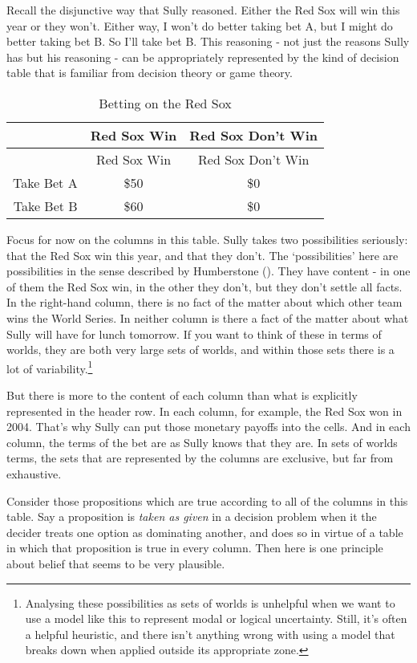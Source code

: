 \documentclass[
  10pt,
  letterpaper,
  twoside]{scrbook}
\begin{document}
Recall the disjunctive way that Sully reasoned. Either the Red Sox will
win this year or they won't. Either way, I won't do better taking bet A,
but I might do better taking bet B. So I'll take bet B. This reasoning -
not just the reasons Sully has but his reasoning - can be appropriately
represented by the kind of decision table that is familiar from decision
theory or game theory.

\begin{longtable}[]{@{}rcc@{}}
\caption{Betting on the Red Sox}\label{tbl-redsox}\tabularnewline
\toprule\noalign{}
~ & Red Sox Win & Red Sox Don't Win \\
\midrule\noalign{}
\endfirsthead
\toprule\noalign{}
~ & Red Sox Win & Red Sox Don't Win \\
\midrule\noalign{}
\endhead
\bottomrule\noalign{}
\endlastfoot
Take Bet A & \$50 & \$0 \\
Take Bet B & \$60 & \$0 \\
\end{longtable}

Focus for now on the columns in this table. Sully takes two
possibilities seriously: that the Red Sox win this year, and that they
don't. The `possibilities' here are possibilities in the sense described
by Humberstone (). They have content
- in one of them the Red Sox win, in the other they don't, but they
don't settle all facts. In the right-hand column, there is no fact of
the matter about which other team wins the World Series. In neither
column is there a fact of the matter about what Sully will have for
lunch tomorrow. If you want to think of these in terms of worlds, they
are both very large sets of worlds, and within those sets there is a lot
of variability.\footnote{Analysing these possibilities as sets of worlds
  is unhelpful when we want to use a model like this to represent modal
  or logical uncertainty. Still, it's often a helpful heuristic, and
  there isn't anything wrong with using a model that breaks down when
  applied outside its appropriate zone.}

But there is more to the content of each column than what is explicitly
represented in the header row. In each column, for example, the Red Sox
won in 2004. That's why Sully can put those monetary payoffs into the
cells. And in each column, the terms of the bet are as Sully knows that
they are. In sets of worlds terms, the sets that are represented by the
columns are exclusive, but far from exhaustive.

Consider those propositions which are true according to all of the
columns in this table. Say a proposition is \emph{taken as given} in a
decision problem when it the decider treats one option as dominating
another, and does so in virtue of a table in which that proposition is
true in every column. Then here is one principle about belief that seems
to be very plausible.
\end{document}
